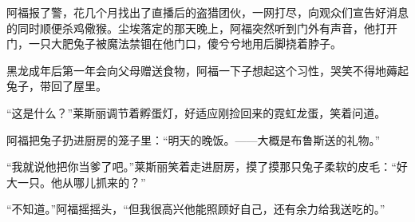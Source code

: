 \documentclass[../main.tex]{subfiles}
\begin{document}
阿福报了警，花几个月找出了直播后的盗猎团伙，一网打尽，向观众们宣告好消息的同时顺便杀鸡儆猴。尘埃落定的那天晚上，阿福突然听到门外有声音，他打开门，一只大肥兔子被魔法禁锢在他门口，傻兮兮地用后脚挠着脖子。

黑龙成年后第一年会向父母赠送食物，阿福一下子想起这个习性，哭笑不得地薅起兔子，带回了屋里。

“这是什么？”莱斯丽调节着孵蛋灯，好适应刚捡回来的霓虹龙蛋，笑着问道。

阿福把兔子扔进厨房的笼子里：“明天的晚饭。——大概是布鲁斯送的礼物。”

“我就说他把你当爹了吧。”莱斯丽笑着走进厨房，摸了摸那只兔子柔软的皮毛：“好大一只。他从哪儿抓来的？”

“不知道。”阿福摇摇头，“但我很高兴他能照顾好自己，还有余力给我送吃的。”

\storyend
\end{document}
